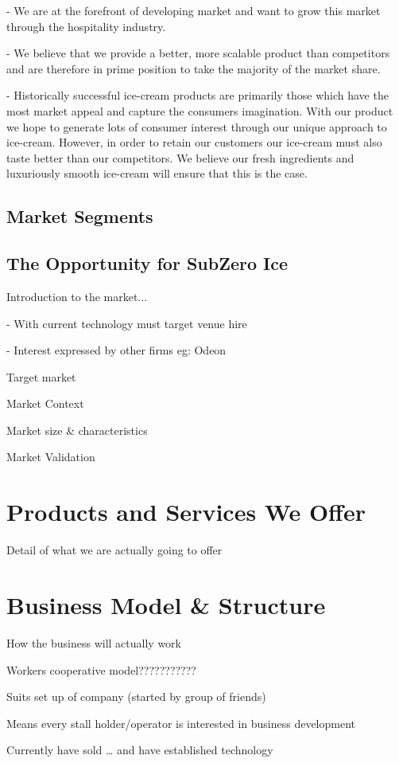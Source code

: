 \documentclass{article}
\begin{document}
 - We are at the forefront of developing market and want to grow this
market through the hospitality industry.

 - We believe that we provide a better, more scalable product than
competitors and are therefore in prime position to take the majority
of the market share.

 - Historically successful ice-cream products are primarily those
which have the most market appeal and capture the consumers
imagination. With our product we hope to generate lots of consumer
interest through our unique approach to ice-cream. However,
in order to retain our customers our ice-cream must also taste
better than our competitors. We believe our fresh ingredients and
luxuriously smooth ice-cream will ensure that this is the case.

  \subsection{Market Segments}
  \subsection{The Opportunity for SubZero Ice}
  Introduction to the market...

   - With current technology must target venue hire

   - Interest expressed by other firms eg: Odeon

  Target market

  Market Context

  Market size \& characteristics

  Market Validation


\section{Products and Services We Offer}
  Detail of what we are actually going to offer

\section{Business Model \& Structure}
  How the business will actually work

Workers cooperative model???????????

Suits set up of company (started by group of friends)

Means every stall holder/operator is interested in business development

Currently have sold … and have established technology
\end{document}
